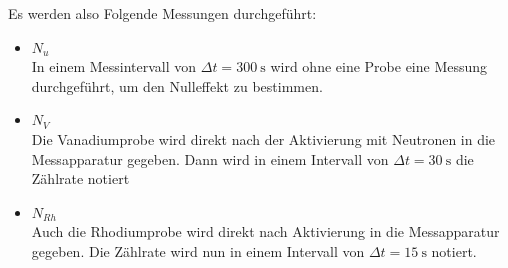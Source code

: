 \noindent Es werden also Folgende Messungen durchgeführt:
\begin{itemize}
    \item $N_u$\\
    In einem Messintervall von $\Delta t=\SI{300}{\second}$ wird ohne eine Probe eine Messung 
    durchgeführt, um den Nulleffekt zu bestimmen.
    \item $N_{V}$\\
    Die Vanadiumprobe wird direkt nach der Aktivierung mit Neutronen in die Messapparatur gegeben. Dann 
    wird in einem Intervall von $\Delta t=\SI{30}{\second}$ die Zählrate notiert 
    \item $N_{Rh}$\\
    Auch die Rhodiumprobe wird direkt nach Aktivierung in die Messapparatur gegeben. Die Zählrate wird 
    nun in einem Intervall von $\Delta t=\SI{15}{\second}$ notiert.
\end{itemize}